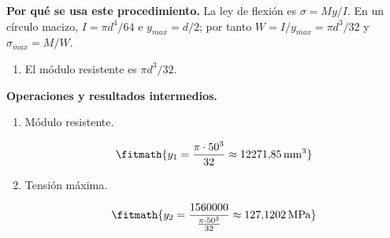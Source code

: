 \noindent\textbf{Por qué se usa este procedimiento.} La ley de flexión es $\sigma=My/I$. En un círculo macizo, $I=\pi d^4/64$ e $y_{max}=d/2$; por tanto $W=I/y_{max}=\pi d^3/32$ y $\sigma_{max}=M/W$.

\begin{enumerate}

\item El módulo resistente es $\pi d^3/32$.

\end{enumerate}

\noindent\textbf{Operaciones y resultados intermedios.}

\begin{enumerate}

\item Módulo resistente.

\[\fitmath{y_{1}=\frac{\pi\cdot {50}^{3}}{32}\approx 12271{,}85\,\mathrm{mm^{3}}}\]

\item Tensión máxima.

\[\fitmath{y_{2}=\frac{1560000}{\frac{\pi\cdot {50}^{3}}{32}}\approx 127{,}1202\,\mathrm{MPa}}\]

\end{enumerate}

